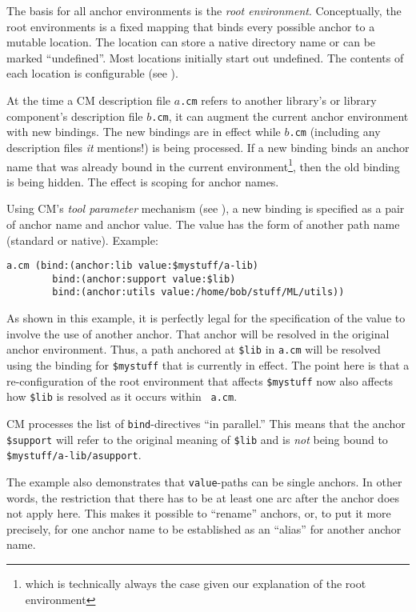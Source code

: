 The basis for all anchor environments is the {\em root environment}.
Conceptually, the root environments is a fixed mapping that binds
every possible anchor to a mutable location.  The location can store a
native directory name or can be marked ``undefined''.  Most locations
initially start out undefined.  The contents of each location is
configurable (see ).

At the time a CM description file $a${\tt .cm} refers to another
library's or library component's description file $b${\tt .cm}, it can
augment the current anchor environment with new bindings.  The new
bindings are in effect while $b${\tt .cm} (including any description
files {\it it}\/ mentions!) is being processed.  If a new binding
binds an anchor name that was already bound in the current
environment\footnote{which is technically always the case given our
explanation of the root environment}, then the old binding is being
hidden.  The effect is scoping for anchor names.

Using CM's {\em tool parameter} mechanism (see
), a new binding is specified as a pair of
anchor name and anchor value.  The value has the form of another path
name (standard or native). Example:

\begin{lstlisting}[language=CM]
  a.cm (bind:(anchor:lib value:$mystuff/a-lib)
        bind:(anchor:support value:$lib)
        bind:(anchor:utils value:/home/bob/stuff/ML/utils))
\end{lstlisting}%

As shown in this example, it is perfectly legal for the specification
of the value to involve the use of another anchor.  That anchor will
be resolved in the original anchor environment. Thus, a path anchored
at {\tt \$lib} in {\tt a.cm} will be resolved using the binding for
{\tt \$mystuff} that is currently in effect.  The point here is that a
re-configuration of the root environment that affects {\tt \$mystuff}
now also affects how {\tt \$lib} is resolved as it occurs within {\tt
a.cm}.

CM processes the list of {\tt bind}-directives ``in parallel.'' This
means that the anchor {\tt \$support} will refer to the original
meaning of {\tt \$lib} and is {\em not} being bound to {\tt
\$mystuff/a-lib/asupport}.

The example also demonstrates that {\tt value}-paths can be single
anchors. In other words, the restriction that there has to be at least
one arc after the anchor does not apply here. This makes it possible
to ``rename'' anchors, or, to put it more precisely, for one anchor
name to be established as an ``alias'' for another anchor name.

